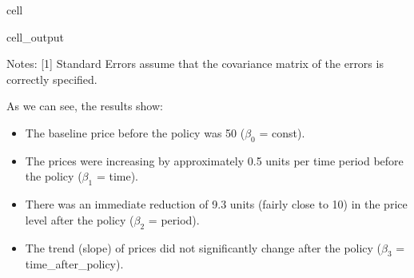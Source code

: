 \documentclass[letterpaper,10pt,english]{jupyterBook}
\begin{document}
\begin{sphinxuseclass}{cell}
\begin{sphinxVerbatimOutput}
\begin{sphinxuseclass}{cell_output}
\begin{sphinxVerbatim}[commandchars=\\\{\}]
Notes:
[1] Standard Errors assume that the covariance matrix of the errors is correctly specified.
\end{sphinxVerbatim}

\end{sphinxuseclass}\end{sphinxVerbatimOutput}

\end{sphinxuseclass}
\sphinxAtStartPar
As we can see, the results show:
\begin{itemize}
\item {} 
\sphinxAtStartPar
The baseline price before the policy was 50 (\(\beta_0\) = const).

\item {} 
\sphinxAtStartPar
The prices were increasing by approximately 0.5 units per time period before the policy (\(\beta_1\) = time).

\item {} 
\sphinxAtStartPar
There was an immediate reduction of 9.3 units (fairly close to 10) in the price level after the policy (\(\beta_2\) = period).

\item {} 
\sphinxAtStartPar
The trend (slope) of prices did not significantly change after the policy (\(\beta_3\) = time\_after\_policy).

\end{itemize}
\end{document}
